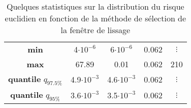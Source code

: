 \begin{table}[H]
\begin{tabularx}{\textwidth}{ccccc}
		\toprule
		\textbf{min}                        & 4$\cdot 10^{-6}$    & 6$\cdot 10^{-6}$   & 0.062    & $\vdots$  \\
		\textbf{max}                        & 67.89               & 0.01               & 0.062    & 210       \\
		\textbf{quantile} $q_{97.5\%}$      & 4.9$\cdot 10^{-3}$  & 4.6$\cdot 10^{-3}$ & 0.062    & $\vdots$  \\
		\textbf{quantile} $q_{95\%}$        & 3.6$\cdot 10^{-3}$  & 3.5$\cdot 10^{-3}$ & 0.062    & $\vdots$  \\

		\bottomrule
	\end{tabularx}
	\caption{Quelques statistiques sur la distribution du risque euclidien en fonction de la méthode de sélection de la fenêtre de lissage}
	\label{tab:stat_R_eucl_min_max_q}
\end{table}



